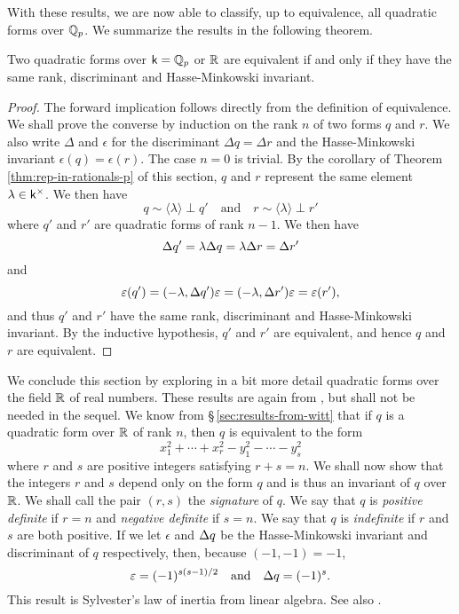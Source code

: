 With these results, we are now able to classify, up to equivalence, all
quadratic forms over \(\mathbb{Q}_p\). We summarize the results in the following
theorem.

\begin{theoremx}{\normalfont\cite[p.~39]{serre2012course}} Two quadratic forms
    over \(\mathsf{k} = \mathbb{Q}_p\) or \(\mathbb{R}\) are equivalent if and only if
    they have the same rank, discriminant and Hasse-Minkowski invariant.
\end{theoremx}

\begin{proof}
    The forward implication follows directly from the definition of equivalence.
    We shall prove the converse by induction on the rank \(n\) of two  forms
    \(q\) and \(r\). We also write \(\Delta\) and \(\epsilon\) for the
    discriminant \(\Delta q = \Delta r\) and the Hasse-Minkowski invariant
    \(\epsilon(q) = \epsilon(r)\). The case \(n = 0\) is trivial. By the
    corollary of Theorem\,\ref{thm:rep-in-rationals-p} of this section, \(q\)
    and \(r\) represent the same element \(\lambda \in \mathsf{k}^{\times}\). We then have
    \[
        q \sim \langle \lambda \rangle \perp q' \quad \text{and} \quad r \sim \langle \lambda \rangle \perp r'
    \]
    where \(q'\) and \(r'\) are quadratic forms of rank \(n - 1\). We then have
    \[
      {\Delta} q' = \lambda {\Delta} q = \lambda {\Delta} r = {\Delta} r'
    \]
    and 
    \[
        \varepsilon(q') = (-\lambda, {\Delta} q')\varepsilon = (-\lambda, {\Delta} r')\varepsilon = \varepsilon(r'),
    \]
    and thus \(q'\) and \(r'\) have the same rank, discriminant and
    Hasse-Minkowski invariant. By the inductive hypothesis, \(q'\) and \(r'\)
    are equivalent, and hence \(q\) and \(r\) are equivalent.
\end{proof}

We conclude this section by exploring in a bit more detail quadratic forms over
the field \(\mathbb{R}\) of real numbers. These results are again from
\cite{serre2012course}, but shall not be needed in the sequel. We know from
\S\,\ref{sec:results-from-witt} that if \(q\) is a quadratic form over
\(\mathbb{R}\) of rank \(n\), then \(q\) is equivalent to the form
\[
    x_1^2 + \cdots + x_{r}^2 - y_1^2 - \cdots - y_{s}^2
\]
where \(r\) and \(s\) are positive integers satisfying \(r + s = n\). We shall
now show that the integers \(r\) and \(s\) depend only on the form \(q\) and is
thus an invariant of \(q\) over \(\mathbb{R}\). We shall call the pair \((r,s)\) the
\emph{signature} of \(q\). We say that \(q\) is \emph{positive
definite} if \(r = n\) and \emph{negative definite} if \(s = n\). We say that
\(q\) is \emph{indefinite} if \(r\) and \(s\) are both positive. If we let
\(\epsilon\) and \({\Delta} q\) be the Hasse-Minkowski invariant and discriminant
of \(q\) respectively, then, because \((-1, -1) = -1\),
\[
    \varepsilon = (-1)^{s(s-1)/2} \quad \text{and} \quad {\Delta} q = (-1)^{s}.
\]
This result is Sylvester's law of inertia from linear algebra. See also
\cite[pp.~83--84]{szymiczek2017bilinear}.

